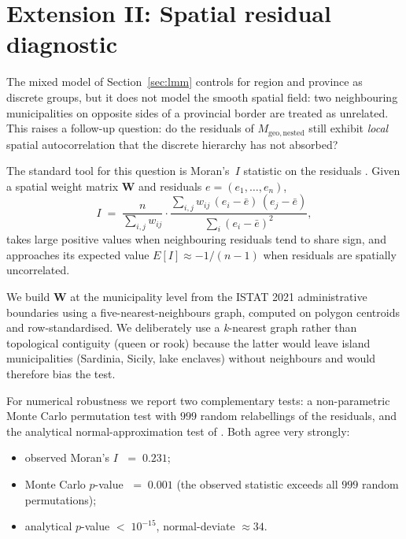 \documentclass[11pt,a4paper]{article}
\begin{document}
\section{Extension II: Spatial residual diagnostic}
\label{sec:moran}

The mixed model of Section~\ref{sec:lmm} controls for region and
province as discrete groups, but it does not model the smooth spatial
field: two neighbouring municipalities on opposite sides of a
provincial border are treated as unrelated. This raises a follow-up
question: do the residuals of \(M_{\mathrm{geo,nested}}\) still
exhibit \emph{local} spatial autocorrelation that the discrete
hierarchy has not absorbed?

The standard tool for this question is Moran's~\(I\) statistic on the
residuals \citep{moran1950}. Given a spatial weight matrix
\(\mathbf{W}\) and residuals \(e = (e_{1}, \dots, e_{n})\),
\begin{equation}
  I \;=\; \frac{n}{\sum_{i,j} w_{ij}}
    \cdot \frac{\sum_{i,j} w_{ij}\,(e_i - \bar e)\,(e_j - \bar e)}{\sum_i (e_i - \bar e)^{2}},
  \label{eq:moran}
\end{equation}
takes large positive values when neighbouring residuals tend to share
sign, and approaches its expected value \(E[I] \approx -1/(n-1)\)
when residuals are spatially uncorrelated.

We build \(\mathbf{W}\) at the municipality level from the ISTAT
2021 administrative boundaries using a five-nearest-neighbours
graph, computed on polygon centroids and row-standardised. We
deliberately use a \emph{k}-nearest graph rather than topological
contiguity (queen or rook) because the latter would leave island
municipalities (Sardinia, Sicily, lake enclaves) without neighbours
and would therefore bias the test.

For numerical robustness we report two complementary tests: a
non-parametric Monte Carlo permutation test with \(999\) random
relabellings of the residuals, and the analytical normal-approximation
test of \citet{cliffOrd1981}. Both agree very strongly:
\begin{itemize}[leftmargin=2em]
  \item observed Moran's \(I\) \(\;=\; 0.231\);
  \item Monte Carlo \(p\)-value \(\;=\; 0.001\) (the observed
    statistic exceeds all \(999\) random permutations);
  \item analytical \(p\)-value \(<\; 10^{-15}\), normal-deviate
    \(\approx 34\).
\end{itemize}
\end{document}
